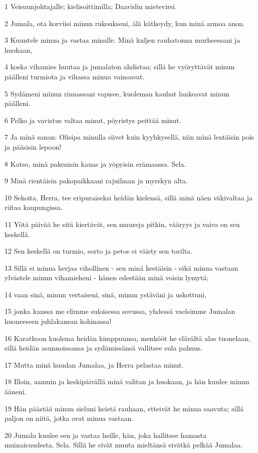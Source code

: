 \par 1 Veisuunjohtajalle; kielisoittimilla; Daavidin mietevirsi.
\par 2 Jumala, ota korviisi minun rukoukseni, älä kätkeydy, kun minä armoa anon.
\par 3 Kuuntele minua ja vastaa minulle. Minä kuljen rauhatonna murheessani ja huokaan,
\par 4 koska vihamies huutaa ja jumalaton ahdistaa; sillä he vyöryttävät minun päälleni turmiota ja vihassa minua vainoavat.
\par 5 Sydämeni minun rinnassani vapisee, kuoleman kauhut lankeavat minun päälleni.
\par 6 Pelko ja vavistus valtaa minut, pöyristys peittää minut.
\par 7 Ja minä sanon: Olisipa minulla siivet kuin kyyhkysellä, niin minä lentäisin pois ja pääsisin lepoon!
\par 8 Katso, minä pakenisin kauas ja yöpyisin erämaassa. Sela.
\par 9 Minä rientäisin pakopaikkaani rajuilman ja myrskyn alta.
\par 10 Sekoita, Herra, tee eripuraiseksi heidän kielensä, sillä minä näen väkivaltaa ja riitaa kaupungissa.
\par 11 Yötä päivää he sitä kiertävät, sen muureja pitkin, vääryys ja vaiva on sen keskellä.
\par 12 Sen keskellä on turmio, sorto ja petos ei väisty sen torilta.
\par 13 Sillä ei minua herjaa vihollinen - sen minä kestäisin - eikä minua vastaan ylvästele minun vihamieheni - hänen edestään minä voisin lymytä;
\par 14 vaan sinä, minun vertaiseni, sinä, minun ystäväni ja uskottuni,
\par 15 jonka kanssa me elimme suloisessa sovussa, yhdessä vaelsimme Jumalan huoneeseen juhlakansan kohinassa!
\par 16 Karatkoon kuolema heidän kimppuunsa, menkööt he elävältä alas tuonelaan, sillä heidän asunnoissansa ja sydämissänsä vallitsee sula pahuus.
\par 17 Mutta minä huudan Jumalaa, ja Herra pelastaa minut.
\par 18 Illoin, aamuin ja keskipäivällä minä valitan ja huokaan, ja hän kuulee minun ääneni.
\par 19 Hän päästää minun sieluni heistä rauhaan, etteivät he minua saavuta; sillä paljon on niitä, jotka ovat minua vastaan.
\par 20 Jumala kuulee sen ja vastaa heille, hän, joka hallitsee hamasta muinaisuudesta. Sela. Sillä he eivät muuta mieltänsä eivätkä pelkää Jumalaa.
